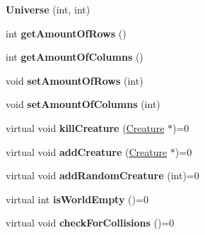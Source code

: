 \begin{DoxyCompactItemize}
\item 
{\bfseries Universe} (int, int)\hypertarget{class_universe_ad3f8dfc7f0c2e14d08779fc84a8d893a}{}\label{class_universe_ad3f8dfc7f0c2e14d08779fc84a8d893a}

\item 
int {\bfseries get\+Amount\+Of\+Rows} ()\hypertarget{class_universe_a8f219d93acf88902438497356fb4b79d}{}\label{class_universe_a8f219d93acf88902438497356fb4b79d}

\item 
int {\bfseries get\+Amount\+Of\+Columns} ()\hypertarget{class_universe_a5b0a0f6b1927e223b0a18f2474a05711}{}\label{class_universe_a5b0a0f6b1927e223b0a18f2474a05711}

\item 
void {\bfseries set\+Amount\+Of\+Rows} (int)\hypertarget{class_universe_af0124aca57a7ff286132e8525bd1c378}{}\label{class_universe_af0124aca57a7ff286132e8525bd1c378}

\item 
void {\bfseries set\+Amount\+Of\+Columns} (int)\hypertarget{class_universe_a9597c59c4bf80e17c852596acf25dfc4}{}\label{class_universe_a9597c59c4bf80e17c852596acf25dfc4}

\item 
virtual void {\bfseries kill\+Creature} (\hyperlink{class_creature}{Creature} $\ast$)=0\hypertarget{class_universe_ae92953c55e994fd3db8ac022ef69c227}{}\label{class_universe_ae92953c55e994fd3db8ac022ef69c227}

\item 
virtual void {\bfseries add\+Creature} (\hyperlink{class_creature}{Creature} $\ast$)=0\hypertarget{class_universe_a882e14be433281816c58b9ccfb8d4d01}{}\label{class_universe_a882e14be433281816c58b9ccfb8d4d01}

\item 
virtual void {\bfseries add\+Random\+Creature} (int)=0\hypertarget{class_universe_a7289af8da66eed7c88763342c5689efb}{}\label{class_universe_a7289af8da66eed7c88763342c5689efb}

\item 
virtual int {\bfseries is\+World\+Empty} ()=0\hypertarget{class_universe_a090dce863386ed5cdba01d440de1edfd}{}\label{class_universe_a090dce863386ed5cdba01d440de1edfd}

\item 
virtual void {\bfseries check\+For\+Collisions} ()=0\hypertarget{class_universe_aaefe829c75ee2290de431e16065dde83}{}\label{class_universe_aaefe829c75ee2290de431e16065dde83}


\end{DoxyCompactItemize}
